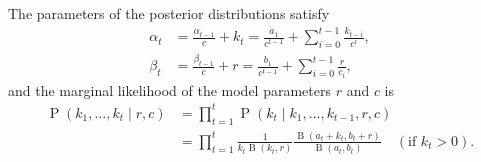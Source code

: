 \documentclass[12pt,a4paper]{article}
\DeclareMathOperator\Pb{P}                    %
\DeclareMathOperator\B{B}                     %
\begin{document}
The parameters of the posterior distributions satisfy
\begin{align*}
  \alpha_t &= \frac{\alpha_{t-1}}{c} + k_t
    = \frac{a_1}{c^{t-1}} + \sum_{i=0}^{t-1} \frac{k_{t-i}}{c^i}, \\
  \beta_t &= \frac{\beta_{t-1}}{c} + r
    = \frac{b_1}{c^{t-1}} + \sum_{i=0}^{t-1} \frac{r}{c_i},
\end{align*}
and the marginal likelihood of the model parameters $r$ and $c$ is
\begin{align*}
  \Pb(k_1, \dots, k_t \mid r, c)
    &= \prod_{t=1}^{t} \Pb(k_t \mid k_1, \dots, k_{t-1}, r, c) \\
  &= \prod_{t=1}^{t} \frac{1}{k_t\B(k_t, r)}
    \frac{\B(a_t + k_t, b_t + r)}{\B(a_t, b_t)} \quad (\text{if } k_t > 0).
\end{align*}
\end{document}
